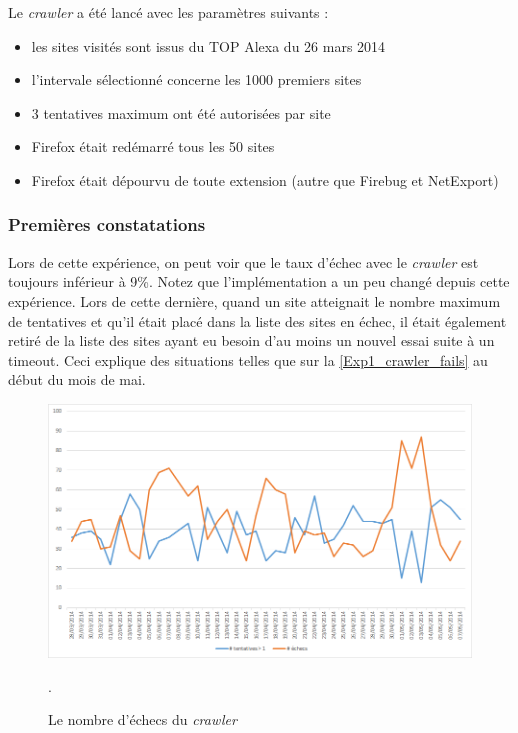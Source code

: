 Le \textit{crawler} a été lancé avec les paramètres suivants :
\begin{itemize}
	\item les sites visités sont issus du TOP Alexa du 26 mars 2014
	\item l'intervale sélectionné concerne les 1000 premiers sites
	\item 3 tentatives maximum ont été autorisées par site
	\item Firefox était redémarré tous les 50 sites
	\item Firefox était dépourvu de toute extension (autre que Firebug et NetExport)
	\newline
\end{itemize}

\subsubsection{Premières constatations}
Lors de cette expérience, on peut voir que le taux d'échec avec le \textit{crawler} est toujours inférieur à 9\%.
Notez que l'implémentation a un peu changé depuis cette expérience. Lors de cette dernière, quand un site atteignait le nombre maximum de tentatives et qu'il était placé dans la liste des sites en échec, il était également retiré de la liste des sites ayant eu besoin d'au moins un nouvel essai suite à un timeout.
Ceci explique des situations telles que sur la \autoref{Exp1_crawler_fails} au début du mois de mai.

\begin{figure}[h]
	\centering
	\includegraphics[scale=.7]{graphiques/Exp1_crawler_fails.png}
	\caption{\label{Exp1_crawler_fails}Le nombre d'échecs du \textit{crawler}}.
\end{figure}

